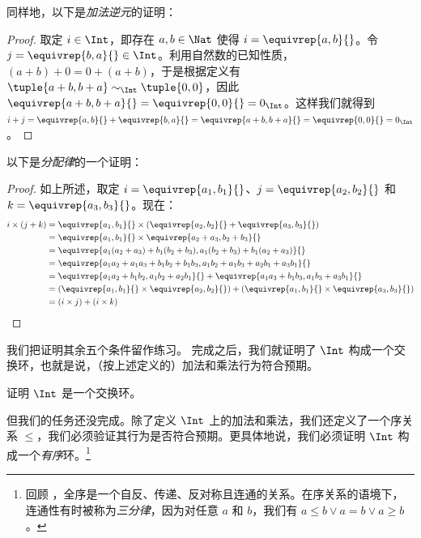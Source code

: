 \documentclass[../../../include/open-logic-section]{subfiles}
\begin{document}
同样地，以下是\emph{加法逆元}的证明：

\begin{proof}
取定 $i \in \Int$，即存在 $a,b \in \Nat$ 使得 $i = \equivrep{a,b}{}$。令 $j = \equivrep{b,a}{} \in \Int$。利用自然数的已知性质，$(a+b) + 0 = 0 + (a+b)$，于是根据定义有 $\tuple{a+b, b+a} \sim_{\Int} \tuple{0,0}$，因此 $\equivrep{a+b, b+a}{} = \equivrep{0, 0}{} = 0_{\Int}$。这样我们就得到 $i + j =
\equivrep{a,b}{}+\equivrep{b,a}{}=\equivrep{a+b, b+a}{}= \equivrep{0,
0}{} = 0_{\Int}$。
\end{proof}

以下是\emph{分配律}的一个证明：
\begin{proof}
如上所述，取定 $i = \equivrep{a_1, b_1}{}$、$j =
\equivrep{a_2,b_2}{}$ 和 $k = \equivrep{a_3, b_3}{}$。现在：
\begin{align*}
	i \times (j + k)
	&= \equivrep{a_1, b_1}{} \times (\equivrep{a_2,b_2}{} + \equivrep{a_3, b_3}{})\\
	&= \equivrep{a_1, b_1}{} \times \equivrep{a_2 + a_3,b_2+b_3}{}\\
	&= \equivrep{a_1  (a_2 + a_3) + b_1  (b_2+b_3), a_1  (b_2 + b_3) + b_1 (a_2 + a_3)}{}\\
	&= \equivrep{a_1 a_2 + a_1a_3 + b_1 b_2+b_1b_3, a_1 b_2 + a_1b_3 + a_2b_1 + a_3b_1}{}\\
	&= \equivrep{a_1a_2 + b_1b_2, a_1b_2 + a_2b_1}{} + \equivrep{a_1a_3 + b_1b_3, a_1b_3 + a_3b_1}{}\\
	&= (\equivrep{a_1, b_1}{} \times \equivrep{a_2,b_2}{}) + (\equivrep{a_1, b_1}{} \times  \equivrep{a_3, b_3}{})\\
	&= (i \times j) + (i \times k)
\end{align*}
\end{proof}

我们把证明其余五个条件留作练习。
完成之后，我们就证明了 $\Int$ 构成一个交换环，也就是说，（按上述定义的）加法和乘法行为符合预期。

\begin{prob}
证明 $\Int$ 是一个交换环。
\end{prob}

但我们的任务还没完成。除了定义 $\Int$ 上的加法和乘法，我们还定义了一个序关系 $\leq$，我们必须验证其行为是否符合预期。更具体地说，我们必须证明 $\Int$ 构成一个\emph{有序}环。\footnote{回顾 ，全序是一个自反、传递、反对称且连通的关系。在序关系的语境下，连通性有时被称为\emph{三分律}，因为对任意 $a$ 和 $b$，我们有 $a \leq b \lor a
	= b \lor a \geq b$。}
\end{document}
